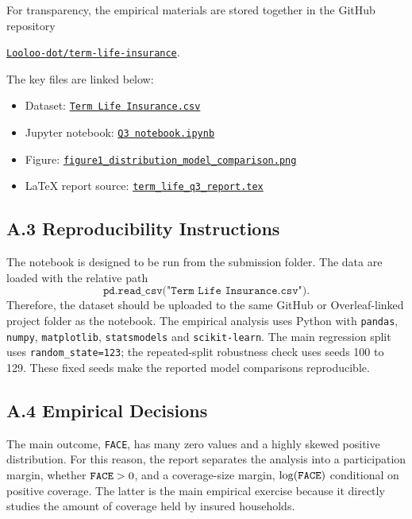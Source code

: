 \documentclass[10pt,a4paper]{article}
\newcommand{\mtt}[1]{\text{\texttt{#1}}}
\begin{document}
For transparency, the empirical materials are stored together in the GitHub repository
\begin{center}
\href{https://github.com/Looloo-dot/term-life-insurance}{\texttt{Looloo-dot/term-life-insurance}}.
\end{center}
The key files are linked below:
\begin{itemize}
\item Dataset: \href{https://github.com/Looloo-dot/term-life-insurance/blob/main/Term\%20Life\%20Insurance.csv}{\texttt{Term Life Insurance.csv}}
\item Jupyter notebook: \href{https://github.com/Looloo-dot/term-life-insurance/blob/main/Q3\%20notebook.ipynb}{\texttt{Q3 notebook.ipynb}}
\item Figure: \href{https://github.com/Looloo-dot/term-life-insurance/blob/main/figures/figure1\_distribution\_model\_comparison.png}{\texttt{figure1\_\allowbreak distribution\_\allowbreak model\_\allowbreak comparison.png}}
\item LaTeX report source: \href{https://github.com/Looloo-dot/term-life-insurance/blob/main/term\_life\_q3\_report.tex}{\texttt{term\_life\_q3\_report.tex}}
\end{itemize}

\subsection*{A.3 Reproducibility Instructions}

The notebook is designed to be run from the submission folder. The data are loaded with the relative path
\[
\texttt{pd.read\_csv("Term Life Insurance.csv")}.
\]
Therefore, the dataset should be uploaded to the same GitHub or Overleaf-linked project folder as the notebook. The empirical analysis uses Python with \texttt{pandas}, \texttt{numpy}, \texttt{matplotlib}, \texttt{statsmodels} and \texttt{scikit-learn}. The main regression split uses \texttt{random\_state=123}; the repeated-split robustness check uses seeds 100 to 129. These fixed seeds make the reported model comparisons reproducible.

\subsection*{A.4 Empirical Decisions}

The main outcome, \texttt{FACE}, has many zero values and a highly skewed positive distribution. For this reason, the report separates the analysis into a participation margin, whether $\mtt{FACE}>0$, and a coverage-size margin, $\log(\mtt{FACE})$ conditional on positive coverage. The latter is the main empirical exercise because it directly studies the amount of coverage held by insured households.
\end{document}
